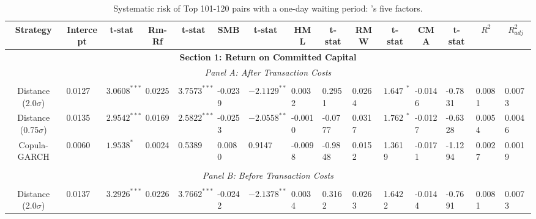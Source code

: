 \documentclass[a4paper]{article}
\begin{document}
\begin{sidewaystable}
	\caption{Systematic risk of Top 101-120 pairs with a one-day waiting period: \citet*{ff15}'s five factors.}
	\begin{threeparttable}[H]
		\centering \scriptsize
		\begin{tabularx}{\textwidth}{@{\extracolsep{\fill}}lllllllllllllll@{}}
			\toprule
			\multicolumn{1}{c}{Strategy} & \multicolumn{1}{c}{Intercept} & \multicolumn{1}{c}{t-stat} & \multicolumn{1}{c}{Rm-Rf} & \multicolumn{1}{c}{t-stat} & \multicolumn{1}{c}{SMB} & \multicolumn{1}{c}{t-stat} & \multicolumn{1}{c}{HML} & \multicolumn{1}{c}{t-stat} & \multicolumn{1}{c}{RMW} & \multicolumn{1}{c}{t-stat} & \multicolumn{1}{c}{CMA} & \multicolumn{1}{c}{t-stat} & \multicolumn{1}{c}{$R^{2}$} & \multicolumn{1}{c}{$R^{2}_{adj}$} \\
			\midrule
			\multicolumn{15}{c}{\textbf{Section 1: Return on Committed Capital}} \\
			\multicolumn{15}{c}{\textit{Panel A: After Transaction Costs}} \\
			\multicolumn{1}{c}{} & \multicolumn{1}{c}{} & \multicolumn{1}{c}{} & \multicolumn{1}{c}{} & \multicolumn{1}{c}{} & \multicolumn{1}{c}{} & \multicolumn{1}{c}{} & \multicolumn{1}{c}{} &       &       &       &       &       &       &  \\
			\multicolumn{1}{c}{Distance (2.0$\sigma$)} & 0.0127 & $3.0608^{***}$ & 0.0225 & $3.7573^{***}$ & -0.0239 & $-2.1129^{**}$ & 0.0032 & 0.2951 & 0.0264 & $1.6477^{*}$ & -0.0146 & -0.7831 & 0.0081 & 0.0073 \\
			\multicolumn{1}{c}{Distance (0.75$\sigma$)} & 0.0135 & $2.9542^{***}$ & 0.0169 & $2.5822^{***}$ & -0.0253 & $-2.0558^{**}$ & -0.0010 & -0.0777 & 0.0317 & $1.7620^{*}$ & -0.0127 & -0.6328 & 0.0054 & 0.0046 \\
			\multicolumn{1}{c}{Copula-GARCH} & 0.0060 & $1.9538^{*}$ & 0.0024 & 0.5389 & 0.0080 & 0.9147 & -0.0098 & -0.9848 & 0.0152 & 1.3619 & -0.0171 & -1.1294 & 0.0027 & 0.0019  \\
			&       &       &       &       &       &       &       &       &       &       &       &       &       &  \\
			\multicolumn{15}{c}{\textit{Panel B: Before Transaction Costs}} \\
			&       &       &       &       &       &       &       &       &       &       &       &       &       &  \\
			\multicolumn{1}{c}{Distance (2.0$\sigma$)} & 0.0137 & $3.2926^{***}$ & 0.0226 & $3.7662^{***}$ & -0.0242 & $-2.1378^{**}$ & 0.0034 & 0.3162 & 0.0263 & 1.6422 & -0.0144 & -0.7691 & 0.0081 & 0.0073 \\

\end{tabularx}
\end{threeparttable}
\end{sidewaystable}
\end{document}
